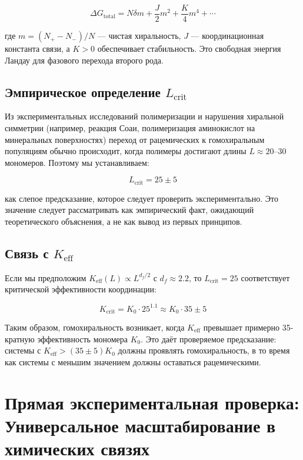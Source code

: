 \documentclass[12pt,a4paper]{article}
\theoremstyle{remark}
\newcommand{\Keff}{K_{\mathrm{eff}}}
\newcommand{\df}{d_{\!f}}
\newcommand{\Kcrit}{K_{\mathrm{crit}}}
\begin{document}
	\begin{equation}
		\Delta G_{\text{total}} = N \delta m + \frac{J}{2} m^2 + \frac{K}{4} m^4 + \cdots
		\label{eq:chiral-free}
	\end{equation}
	
	где $m = (N_+ - N_-)/N$ — чистая хиральность, $J$ — координационная константа связи, а $K > 0$ обеспечивает стабильность. Это свободная энергия Ландау для фазового перехода второго рода.
	
	\subsection{Эмпирическое определение $L_{\text{crit}}$}
	
	Из экспериментальных исследований полимеризации и нарушения хиральной симметрии (например, реакция Соаи, полимеризация аминокислот на минеральных поверхностях) переход от рацемических к гомохиральным популяциям обычно происходит, когда полимеры достигают длины $L \approx 20$--$30$ мономеров. Поэтому мы устанавливаем:
	
	\begin{equation}
		\boxed{L_{\text{crit}} = 25 \pm 5}
		\label{eq:Lcrit-empirical}
	\end{equation}
	
	как слепое предсказание, которое следует проверить экспериментально. Это значение следует рассматривать как эмпирический факт, ожидающий теоретического объяснения, а не как вывод из первых принципов.
	
	\subsection{Связь с $\Keff$}
	
	Если мы предположим $\Keff(L) \propto L^{\df/2}$ с $\df \approx 2.2$, то $L_{\text{crit}} = 25$ соответствует критической эффективности координации:
	
	\begin{equation}
		\Kcrit = K_0 \cdot 25^{1.1} \approx K_0 \cdot 35 \pm 5
		\label{eq:Kcrit-from-L}
	\end{equation}
	
	Таким образом, гомохиральность возникает, когда $\Keff$ превышает примерно 35-кратную эффективность мономера $K_0$. Это даёт проверяемое предсказание: системы с $\Keff > (35 \pm 5) K_0$ должны проявлять гомохиральность, в то время как системы с меньшим значением должны оставаться рацемическими.
	
	\section{Прямая экспериментальная проверка: Универсальное масштабирование в химических связях}
	\label{sec:experimental-verification}
	
\end{document}
